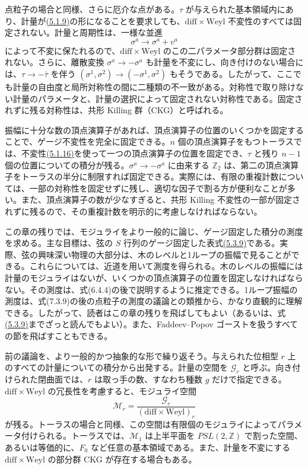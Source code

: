点粒子の場合と同様、さらに厄介な点がある。$\tau$ が与えられた基本領域内にあり、計量が\hyperref[eq:5.1.9]{(5.1.9)}の形になることを要求しても、$\mathrm{diff}\times\mathrm{Weyl}$ 不変性のすべては固定されない。計量と周期性は、一様な並進
\begin{equation}
\sigma^a\longrightarrow\sigma^a+v^a
\tag{5.1.16}\label{eq:5.1.16}
\end{equation}
によって不変に保たれるので、$\mathrm{diff}\times\mathrm{Weyl}$ のこの二パラメータ部分群は固定されない。さらに、離散変換 $\sigma^a\to-\sigma^a$ も計量を不変にし、向き付けのない場合には、$\tau\to-\bar\tau$ を伴う $(\sigma^1,\sigma^2)\to(-\sigma^1,\sigma^2)$ もそうである。したがって、ここでも計量の自由度と局所対称性の間に二種類の不一致がある。対称性で取り除けない計量のパラメータと、計量の選択によって固定されない対称性である。固定されずに残る対称性は、共形 Killing 群（CKG）と呼ばれる。

振幅に十分な数の頂点演算子があれば、頂点演算子の位置のいくつかを固定することで、ゲージ不変性を完全に固定できる。$n$ 個の頂点演算子をもつトーラスでは、不変性\hyperref[eq:5.1.16]{(5.1.16)}を使って一つの頂点演算子の位置を固定でき、$\tau$ と残り $n-1$ 個の位置についての積分が残る。$\sigma^a\to-\sigma^a$ に由来する $\mathbb Z_2$ は、第二の頂点演算子をトーラスの半分に制限すれば固定できる。実際には、有限の重複計数については、一部の対称性を固定せずに残し、適切な因子で割る方が便利なことが多い。また、頂点演算子の数が少なすぎると、共形 Killing 不変性の一部が固定されずに残るので、その重複計数を明示的に考慮しなければならない。


この章の残りでは、モジュライをより一般的に論じ、ゲージ固定した積分の測度を求める。主な目標は、弦の $S$ 行列のゲージ固定した表式\hyperref[eq:5.3.9]{(5.3.9)}である。実際、弦の興味深い物理の大部分は、木のレベルと1ループの振幅で見ることができる。これらについては、近道を用いて測度を得られる。木のレベルの振幅には計量のモジュライはないが、いくつかの頂点演算子の位置を固定しなければならない。その測度は、式(6.4.4)の後で説明するように推定できる。1ループ振幅の測度は、式(7.3.9)の後の点粒子の測度の議論との類推から、かなり直観的に理解できる。したがって、読者はこの章の残りを飛ばしてもよい（あるいは、式\hyperref[eq:5.3.9]{(5.3.9)}までざっと読んでもよい）。また、Faddeev--Popov ゴーストを扱うすべての節を飛ばすこともできる。

\label{sec:5.2}

前の議論を、より一般的かつ抽象的な形で繰り返そう。与えられた位相型 $r$ 上のすべての計量についての積分から出発する。計量の空間を $\mathcal G_r$ と呼ぶ。向き付けられた閉曲面では、$r$ は取っ手の数、すなわち種数 $g$ だけで指定できる。$\mathrm{diff}\times\mathrm{Weyl}$ の冗長性を考慮すると、モジュライ空間
\begin{equation}
\mathcal M_r=\frac{\mathcal G_r}{(\mathrm{diff}\times\mathrm{Weyl})_r}
\tag{5.2.1}\label{eq:5.2.1}
\end{equation}
が残る。トーラスの場合と同様、この空間は有限個のモジュライによってパラメータ付けられる。トーラスでは、$\mathcal M_1$ は上半平面を $PSL(2,\mathbb Z)$ で割った空間、あるいは等価的に、$F_0$ など任意の基本領域である。また、計量を不変にする $\mathrm{diff}\times\mathrm{Weyl}$ の部分群 CKG が存在する場合もある。

